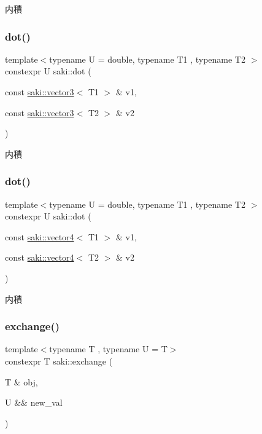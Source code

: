 内積 

\mbox{\label{namespacesaki_a5be905d72bf8dc80abc703fe69fa6fec}} 
\subsubsection{\texorpdfstring{dot()}{dot()}\hspace{0.1cm}{\footnotesize\ttfamily [2/3]}}
{\footnotesize\ttfamily template$<$typename U  = double, typename T1 , typename T2 $>$ \\
constexpr U saki\+::dot (\begin{DoxyParamCaption}\item[{const \mbox{\hyperlink{classsaki_1_1vector3}{saki\+::vector3}}$<$ T1 $>$ \&}]{v1,  }\item[{const \mbox{\hyperlink{classsaki_1_1vector3}{saki\+::vector3}}$<$ T2 $>$ \&}]{v2 }\end{DoxyParamCaption})}



内積 

\mbox{\label{namespacesaki_a990ff61a01d4cf819df3fe2774842acf}} 
\subsubsection{\texorpdfstring{dot()}{dot()}\hspace{0.1cm}{\footnotesize\ttfamily [3/3]}}
{\footnotesize\ttfamily template$<$typename U  = double, typename T1 , typename T2 $>$ \\
constexpr U saki\+::dot (\begin{DoxyParamCaption}\item[{const \mbox{\hyperlink{classsaki_1_1vector4}{saki\+::vector4}}$<$ T1 $>$ \&}]{v1,  }\item[{const \mbox{\hyperlink{classsaki_1_1vector4}{saki\+::vector4}}$<$ T2 $>$ \&}]{v2 }\end{DoxyParamCaption})}



内積 

\mbox{\label{namespacesaki_ace0188c33098d6ac615fc71e64ab6dda}} 
\subsubsection{\texorpdfstring{exchange()}{exchange()}}
{\footnotesize\ttfamily template$<$typename T , typename U  = T$>$ \\
constexpr T saki\+::exchange (\begin{DoxyParamCaption}\item[{T \&}]{obj,  }\item[{U \&\&}]{new\+\_\+val }\end{DoxyParamCaption})}



